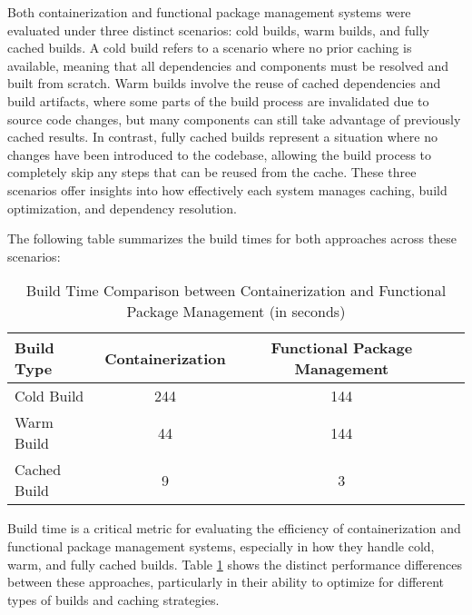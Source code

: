 Both containerization and functional package management systems were evaluated under three
distinct scenarios: cold builds, warm builds, and fully cached builds. A cold build refers to
a scenario where no prior caching is available, meaning that all dependencies and components
must be resolved and built from scratch. Warm builds involve the reuse of cached dependencies
and build artifacts, where some parts of the build process are invalidated due to source code
changes, but many components can still take advantage of previously cached results. In
contrast, fully cached builds represent a situation where no changes have been introduced to
the codebase, allowing the build process to completely skip any steps that can be reused
from the cache. These three scenarios offer insights into how effectively each system
manages caching, build optimization, and dependency resolution.

The following table summarizes the build times for both approaches across these scenarios:

\begin{table}[H]
	\centering
	\caption{Build Time Comparison between Containerization and Functional Package Management (in seconds)}
	\label{tab:build_times}
	\begin{tabular}{|l|c|c|c|}
		\hline
		\textbf{Build Type} & \textbf{Containerization} & \textbf{Functional Package Management} \\
		\hline
		Cold Build          & 244                       & 144                                    \\
		Warm Build          & 44                        & 144                                    \\
		Cached Build        & 9                         & 3                                      \\
		\hline
	\end{tabular}
\end{table}

Build time is a critical metric for evaluating the efficiency of containerization and
functional package management systems, especially in how they handle cold, warm, and fully
cached builds. Table \ref{tab:build_times} shows the distinct performance differences
between these approaches, particularly in their ability to optimize for different types of
builds and caching strategies.

